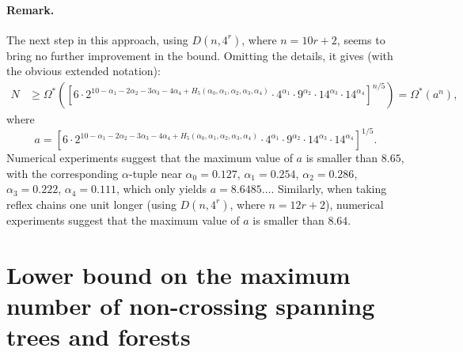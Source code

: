 \documentclass[11pt]{article}
\begin{document}
\paragraph{Remark.}
The next step in this approach, using $D(n,4^r)$, where $n=10r+2$, seems
to bring no further improvement in the bound. Omitting the details, it
gives (with the obvious extended notation):
\begin{align*} N &\geq \Omega^* \left(
\left[ 6 \cdot 2^{10-\alpha_1- 2\alpha_2 - 3\alpha_3 - 4\alpha_4
+ H_5(\alpha_0,\alpha_1,\alpha_2,\alpha_3,\alpha_4)}
\cdot 4^{\alpha_1} \cdot 9^{\alpha_2} \cdot 14^{\alpha_3} \cdot 14^{\alpha_4}
\right]^{n/5} \right) =
\Omega^* \left( a^n \right),
\end{align*}
where
$$ a=\left[6 \cdot 2^{10-\alpha_1- 2\alpha_2 - 3\alpha_3 - 4\alpha_4 +
H_5(\alpha_0,\alpha_1,\alpha_2,\alpha_3,\alpha_4)}
\cdot 4^{\alpha_1} \cdot 9^{\alpha_2} \cdot 14^{\alpha_3} \cdot 14^{\alpha_4}
\right]^{1/5}. $$
Numerical experiments suggest that the maximum value of $a$
is smaller than $8.65$, with the corresponding $\alpha$-tuple near
$\alpha_0=0.127$, $\alpha_1=0.254$,
$\alpha_2=0.286$, $\alpha_3=0.222$, $\alpha_4=0.111$, which only yields
$a= 8.6485\ldots$.
Similarly, when taking reflex chains one unit longer
(using $D(n,4^r)$, where $n=12r+2$), numerical experiments suggest that
the maximum value of $a$ is smaller than $8.64$.


\section{Lower bound on the maximum number of
non-crossing spanning trees and forests} \label{sec:trees}
\end{document}
